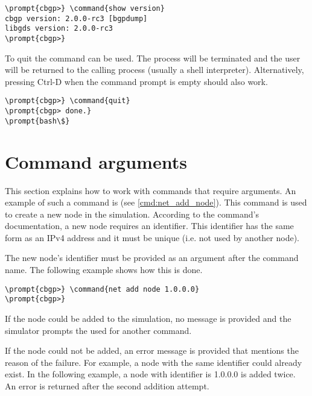 \begin{Verbatim}[commandchars=\\\{\}]
\prompt{cbgp>} \command{show version}
cbgp version: 2.0.0-rc3 [bgpdump]
libgds version: 2.0.0-rc3
\prompt{cbgp>}
\end{Verbatim}

To quit  the  command can be
used. The process will be terminated and the user will be returned to
the calling process (usually a shell interpreter). Alternatively,
pressing Ctrl-D when the command prompt is empty should also work.

\begin{Verbatim}[commandchars=\\\{\}]
\prompt{cbgp>} \command{quit}
\prompt{cbgp> done.} 
\prompt{bash\$}
\end{Verbatim}

\section{Command arguments}
\label{sec:user-interface-arguments}

This section explains how to work with commands that require
arguments. An example of such a command is  (see
\ref{cmd:net_add_node}). This command is used to create a new node in
the simulation. According to the command's documentation, a new node
requires an identifier. This identifier has the same form as an IPv4
address and it must be unique (i.e. not used by another node).

The new node's identifier must be provided as an argument after the
command name. The following example shows how this is done.

\begin{Verbatim}[commandchars=\\\{\}]
\prompt{cbgp>} \command{net add node 1.0.0.0}
\prompt{cbgp>}
\end{Verbatim}

If the node could be added to the simulation, no message is provided
and the simulator prompts the used for another command.

If the node could not be added, an error message is provided that
mentions the reason of the failure. For example, a node with the same
identifier could already exist. In the following example, a node with
identifier is 1.0.0.0 is added twice. An error is returned after the
second addition attempt.

